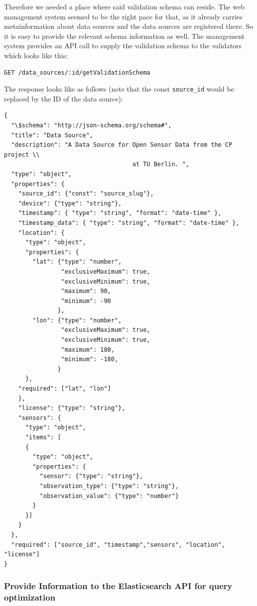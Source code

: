 Therefore we needed a place where said validation schema can reside. The
web management system seemed to be the right pace for that, as it
already carries metainformation about data sources and the data sources
are registered there. So it is easy to provide the relevant schema
information as well. The management system provides an API call to
supply the validation schema to the validators which looks like this:

\begin{verbatim}
GET /data_sources/:id/getValidationSchema
\end{verbatim}

The response looks like as follows (note that the const
\texttt{source\_id} would be replaced by the ID of the data source):

\begin{verbatim}
{
  "\$schema": "http://json-schema.org/schema#",
  "title": "Data Source",
  "description": "A Data Source for Open Sensor Data from the CP project \\
									at TU Berlin. ",
  "type": "object",
  "properties": {
    "source_id": {"const": "source_slug"},
    "device": {"type": "string"},
    "timestamp": { "type": "string", "format": "date-time" },
    "timestamp_data": { "type": "string", "format": "date-time" },
    "location": {
      "type": "object",
      "properties": {
        "lat": {"type": "number",
                "exclusiveMaximum": true,
                "exclusiveMinimum": true,
                "maximum": 90,
                "minimum": -90
               },
        "lon": {"type": "number",
                "exclusiveMaximum": true,
                "exclusiveMinimum": true,
                "maximum": 180,
                "minimum": -180,
               }
      },
    "required": ["lat", "lon"]
    },
    "license": {"type": "string"},
    "sensors": {
      "type": "object",
      "items": [
      {
        "type": "object",
        "properties": {
          "sensor": {"type": "string"},
          "observation_type": {"type": "string"},
          "observation_value": {"type": "number"}
        }
      }]
    }
  },
  "required": ["source_id", "timestamp","sensors", "location", "license"]
}
\end{verbatim}

\subsubsection{Provide Information to the Elasticsearch API for query
optimization}\label{provide-information-to-the-elasticsearch-api-for-query-optimization}

